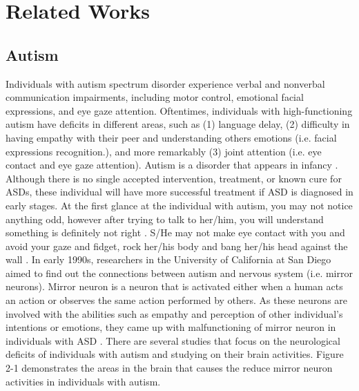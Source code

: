 \chapter{Related Works}

\section{Autism}
Individuals with autism spectrum disorder experience verbal and nonverbal
communication impairments, including motor control, emotional facial expressions, and
eye gaze attention. Oftentimes, individuals with high-functioning autism have deficits in
different areas, such as (1) language delay, (2) difficulty in having empathy with their peer
and understanding others emotions (i.e. facial expressions recognition.), and more
remarkably (3) joint attention (i.e. eye contact and eye gaze attention). Autism is a disorder
that appears in infancy \cite{Epidemiology1966}. Although there is no single accepted intervention, treatment,
or known cure for ASDs, these individual will have more successful treatment if ASD is
diagnosed in early stages. At the first glance at the individual with autism, you may not
notice anything odd, however after trying to talk to her/him, you will understand something
is definitely not right \cite{BrokenMirror2006}. S/He may not make eye contact with you and avoid your gaze
and fidget, rock her/his body and bang her/his head against the wall \cite{BrokenMirror2006}.
In early 1990s, researchers in the University of California at San Diego aimed to
find out the connections between autism and nervous system (i.e. mirror neurons). Mirror
neuron \cite{BrokenMirror2006} is a neuron that is activated either when a human acts an action or observes the
same action performed by others. As these neurons are involved with the abilities such as
empathy and perception of other individual’s intentions or emotions, they came up with 
malfunctioning of mirror neuron in individuals with ASD \cite{BrokenMirror2006}. There are several studies
that focus on the neurological deficits of individuals with autism and studying on their
brain activities. Figure 2-1 demonstrates the areas in the brain that causes the reduce mirror
neuron activities in individuals with autism.\\

